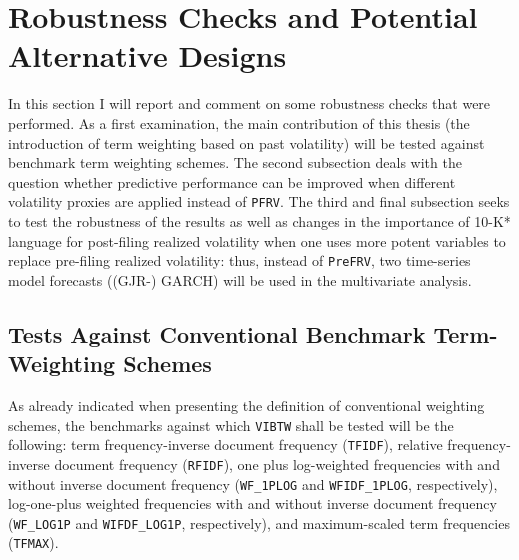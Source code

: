 \section{Robustness Checks and Potential Alternative Designs}
\label{sec: robustness}

In this section I will report and comment on some robustness checks that were performed. As a first examination, the main contribution of this thesis (the introduction of term weighting based on past volatility) will be tested against benchmark term weighting schemes. The second subsection deals with the question whether predictive performance can be improved when different volatility proxies are applied instead of \texttt{PFRV}. The third and final subsection seeks to test the robustness of the results as well as changes in the importance of 10-K* language for post-filing realized volatility when one uses more potent variables to replace pre-filing realized volatility: thus, instead of \texttt{PreFRV}, two time-series model forecasts ((GJR-) GARCH) will be used in the multivariate analysis.


\subsection{Tests Against Conventional Benchmark Term-Weighting Schemes}
\label{ssec: robust_weightschemes}

As already indicated when presenting the definition of conventional weighting schemes, the benchmarks against which \texttt{VIBTW} shall be tested will be the following: term frequency-inverse document frequency (\texttt{TFIDF}), relative frequency-inverse document frequency (\texttt{RFIDF}), one plus log-weighted frequencies with and without inverse document frequency (\texttt{WF\_1PLOG} and \texttt{WFIDF\_1PLOG}, respectively), log-one-plus weighted frequencies with and without inverse document frequency (\texttt{WF\_LOG1P} and \texttt{WIFDF\_LOG1P}, respectively), and maximum-scaled term frequencies (\texttt{TFMAX}). 


